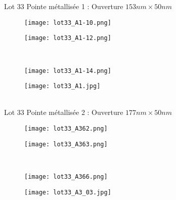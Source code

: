 \documentclass[a4paper,11pt]{article}
\title{}
\author{}
\begin{document}
\begin{figure}[htb]

  Lot 33 Pointe métallisée 1 : Ouverture $153nm \times 50 nm$\\

  \begin{subfigure}[b]{.49\linewidth}
    \centering
    \texttt{[image: lot33\_A1-10.png]}
  \end{subfigure}%
  \begin{subfigure}[b]{.49\linewidth}
    \centering
    \texttt{[image: lot33\_A1-12.png]}
  \end{subfigure}\\
  \begin{subfigure}[b]{.49\linewidth}
    \centering
    \texttt{[image: lot33\_A1-14.png]}
  \end{subfigure}%
  \begin{subfigure}[b]{.30\linewidth}
    \centering
    \texttt{[image: lot33\_A1.jpg]}
  \end{subfigure}%
  \vspace*{1cm}  \\

  Lot 33 Pointe métallisée 2 : Ouverture $177nm \times 50nm$\\

  \begin{subfigure}[b]{.49\linewidth}
    \centering
    \texttt{[image: lot33\_A362.png]}
  \end{subfigure}%
  \begin{subfigure}[b]{.49\linewidth}
    \centering
    \texttt{[image: lot33\_A363.png]}
  \end{subfigure}\\
  \begin{subfigure}[b]{.49\linewidth}
    \centering
    \texttt{[image: lot33\_A366.png]}
  \end{subfigure}%
  \begin{subfigure}[b]{.367\linewidth}
    \centering
    \texttt{[image: lot33\_A3\_03.jpg]}

  \end{subfigure}%
\end{figure}
\end{document}
